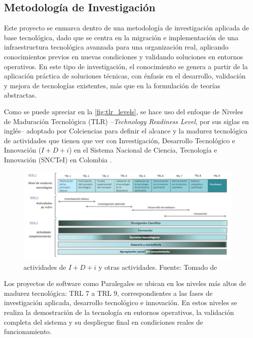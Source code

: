 \subsection{Metodología de Investigación}

Este proyecto se enmarca dentro de una metodología de investigación aplicada de base tecnológica, dado que se centra en la migración e implementación de una infraestructura tecnológica avanzada para una organización real, aplicando conocimientos previos en nuevas condiciones y validando soluciones en entornos operativos. En este tipo de investigación, el conocimiento se genera a partir de la aplicación práctica de soluciones técnicas, con énfasis en el desarrollo, validación y mejora de tecnologías existentes, más que en la formulación de teorías abstractas.

Como se puede apreciar en la \autoref{fig:tlr_levels}, se hace uso del enfoque de Niveles de Maduración Tecnológica (TLR) --\textit{Technology Readiness Level}, por sus siglas en inglés-- adoptado por Colciencias para definir el alcance y la madurez tecnológica de actividades que tienen que ver con Investigación, Desarrollo Tecnológico e Innovación ($I+D+i$) en el Sistema Nacional de Ciencia, Tecnología e Innovación (SNCTeI) en Colombia \cite{Colciencias2016}.

\begin{figure}[H]
  \centering
  \includegraphics[width=1\textwidth]{img/figures/fig8-TLR-explanation.png}
  \caption{actividades de $I+D+i$ y otras actividades. Fuente: Tomado de \cite{Colciencias2016}}
  \label{fig:tlr_levels}
\end{figure}

Los proyectos de software como Paralegales se ubican en los niveles más altos de madurez tecnológica: TRL 7 a TRL 9, correspondientes a las fases de investigación aplicada, desarrollo tecnológico e innovación. En estos niveles se realiza la demostración de la tecnología en entornos operativos, la validación completa del sistema y su despliegue final en condiciones reales de funcionamiento.

